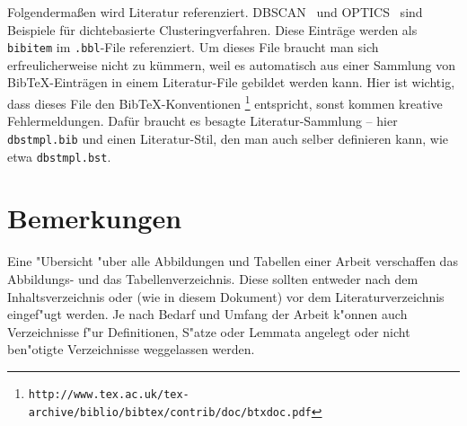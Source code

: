 Folgenderma\ss en wird Literatur referenziert.
DBSCAN~\cite{EKSX96} und OPTICS~\cite{ABKS99} sind Beispiele f\"ur
dichtebasierte Clusteringverfahren. Diese Eintr\"age werden als
{\tt bibitem} im {\tt .bbl}-File referenziert. Um dieses File braucht man
sich erfreulicherweise nicht zu k\"ummern, weil es automatisch aus einer
Sammlung von BibTeX-Eintr\"agen in einem Literatur-File gebildet werden
kann. Hier ist wichtig, dass dieses File den BibTeX-Konventionen
\footnote{{\tt http://www.tex.ac.uk/tex-archive/biblio/bibtex/contrib/doc/btxdoc.pdf}}
entspricht, sonst kommen kreative Fehlermeldungen. Daf\"ur braucht es
besagte Literatur-Sammlung -- hier {\tt dbstmpl.bib}
und einen Literatur-Stil, den man auch selber definieren kann, wie
etwa {\tt dbstmpl.bst}.

\section{Bemerkungen}

Eine "Ubersicht "uber alle Abbildungen und Tabellen einer Arbeit
verschaffen das Abbildungs- und das Tabellenverzeichnis. Diese
sollten entweder nach dem Inhaltsverzeichnis oder (wie in diesem
Dokument) vor dem Literaturverzeichnis eingef"ugt werden.
Je nach Bedarf und Umfang der Arbeit k"onnen auch Verzeichnisse
f"ur Definitionen, S"atze oder Lemmata angelegt oder nicht
ben"otigte Verzeichnisse weggelassen werden.
